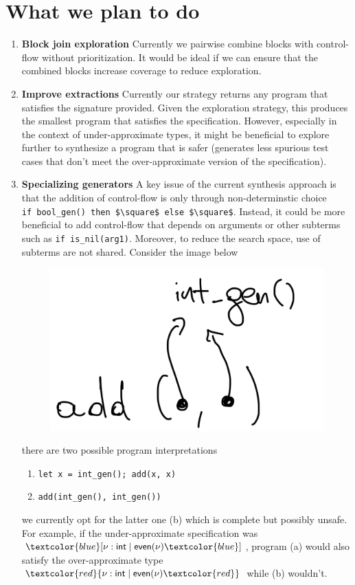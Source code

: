 \documentclass[review, sigplan]{acmart}
\begin{document}
\section*{What we plan to do}

\begin{enumerate}
    \item \textbf{Block join exploration}
    Currently we pairwise combine blocks with control-flow
    without prioritization.
    It would be ideal if we can ensure that the combined
    blocks increase coverage to reduce exploration.
    \item \textbf{Improve extractions} Currently our strategy returns any program that satisfies
    the signature provided.
    Given the exploration strategy, this produces the smallest
    program that satisfies the specification.
    However, especially in the context of under-approximate
    types, it might be beneficial to explore further to
    synthesize a program that is safer (generates less spurious
    test cases that don't meet the over-approximate version of
    the specification).
    \item \textbf{Specializing generators}
    A key issue of the current synthesis approach is that
    the addition of control-flow is only through
    non-determinstic choice \\ \lstinline{if bool_gen() then $\square$ else $\square$}.
    Instead, it could be more beneficial to add control-flow
    that depends on arguments or other subterms such as
    \texttt{if is\_nil(arg1)}.
    Moreover, to reduce the search space, use of subterms
    are not shared. Consider the image below

    \begin{figure}[h!]
    \includegraphics[width=.2\textwidth]{img.png}
    \end{figure}

    there are two possible program interpretations
    \begin{enumerate}
        \item \texttt{let x = int\_gen(); add(x, x)}
        \item \texttt{add(int\_gen(), int\_gen())}
    \end{enumerate}
    we currently opt for the latter one (b) which is
    complete but possibly unsafe.
    For example, if the under-approximate specification was
    ${\textcolor{blue}[}\nu : \textsf{int} \mid \textsf{even}(\nu){\textcolor{blue}]}$,
    program (a) would also satisfy the over-approximate type
    ${\textcolor{red}\{}\nu : \textsf{int} \mid \textsf{even}(\nu){\textcolor{red}\}}$
    while (b) wouldn't.
\end{enumerate}
\end{document}
